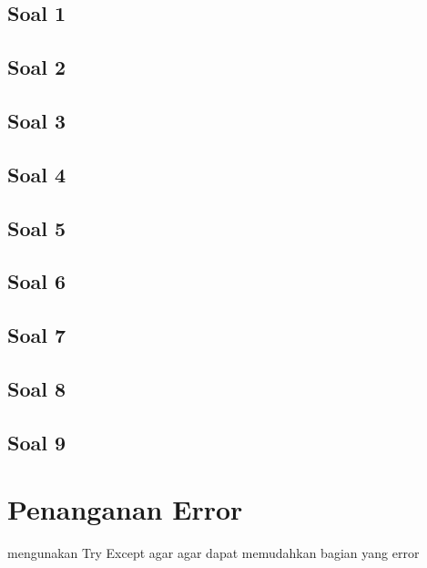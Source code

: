 \documentclass[12pt, times new roman]{report}
\begin{document}
\section*{Soal 1}


\section*{Soal 2}


\section*{Soal 3}


\section*{Soal 4}


\section*{Soal 5}


\section*{Soal 6}


\section*{Soal 7}


\section*{Soal 8}


\section*{Soal 9}


\chapter{Penanganan Error}
\hspace{1cm} mengunakan Try Except agar agar dapat memudahkan bagian yang error


\end{document}
